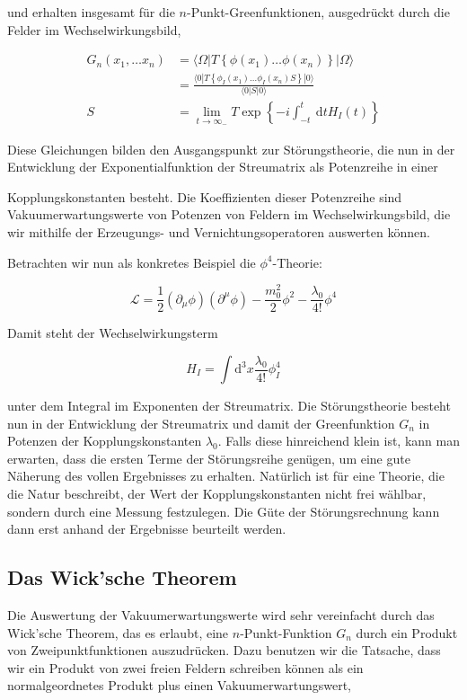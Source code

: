 \documentclass[10pt, letterpaper]{article}
\begin{document}
und erhalten insgesamt für die $n$-Punkt-Greenfunktionen, ausgedrückt durch die Felder im Wechselwirkungsbild,

$$
\begin{aligned}
G_{n}\left(x_{1}, \ldots x_{n}\right) & =\langle\Omega| T\left\{\phi\left(x_{1}\right) \ldots \phi\left(x_{n}\right)\right\}|\Omega\rangle \\
& =\frac{\langle 0| T\left\{\phi_{I}\left(x_{1}\right) \ldots \phi_{I}\left(x_{n}\right) S\right\}|0\rangle}{\langle 0| S|0\rangle} \\
S & =\lim _{t \rightarrow \infty_{-}} T \exp \left\{-i \int_{-t}^{t} \mathrm{~d} t H_{I}(t)\right\}
\end{aligned}
$$

Diese Gleichungen bilden den Ausgangspunkt zur Störungstheorie, die nun in der Entwicklung der Exponentialfunktion der Streumatrix als Potenzreihe in einer

Kopplungskonstanten besteht. Die Koeffizienten dieser Potenzreihe sind Vakuumerwartungswerte von Potenzen von Feldern im Wechselwirkungsbild, die wir mithilfe der Erzeugungs- und Vernichtungsoperatoren auswerten können.

Betrachten wir nun als konkretes Beispiel die $\phi^{4}$-Theorie:

$$
\mathscr{L}=\frac{1}{2}\left(\partial_{\mu} \phi\right)\left(\partial^{\mu} \phi\right)-\frac{m_{0}^{2}}{2} \phi^{2}-\frac{\lambda_{0}}{4!} \phi^{4}
$$

Damit steht der Wechselwirkungsterm

$$
H_{I}=\int \mathrm{d}^{3} x \frac{\lambda_{0}}{4!} \phi_{I}^{4}
$$

unter dem Integral im Exponenten der Streumatrix. Die Störungstheorie besteht nun in der Entwicklung der Streumatrix und damit der Greenfunktion $G_{n}$ in Potenzen der Kopplungskonstanten $\lambda_{0}$. Falls diese hinreichend klein ist, kann man erwarten, dass die ersten Terme der Störungsreihe genügen, um eine gute Näherung des vollen Ergebnisses zu erhalten. Natürlich ist für eine Theorie, die die Natur beschreibt, der Wert der Kopplungskonstanten nicht frei wählbar, sondern durch eine Messung festzulegen. Die Güte der Störungsrechnung kann dann erst anhand der Ergebnisse beurteilt werden.

\subsection*{Das Wick'sche Theorem}
Die Auswertung der Vakuumerwartungswerte wird sehr vereinfacht durch das Wick'sche Theorem, das es erlaubt, eine $n$-Punkt-Funktion $G_{n}$ durch ein Produkt von Zweipunktfunktionen auszudrücken. Dazu benutzen wir die Tatsache, dass wir ein Produkt von zwei freien Feldern schreiben können als ein normalgeordnetes Produkt plus einen Vakuumerwartungswert,
\end{document}
